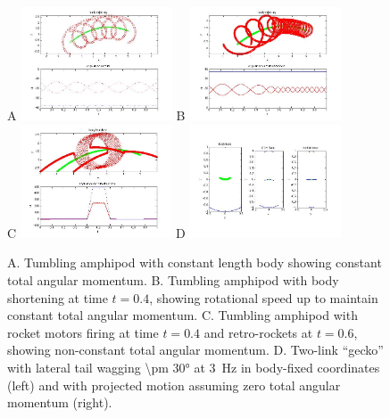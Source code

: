 \documentclass{amsart}
\begin{document}
\begin{figure}
A \includegraphics[width=0.4\textwidth]{figures/untitled.jpg}
B \includegraphics[width=0.4\textwidth]{figures/zam-fling.jpg} \\
C \includegraphics[width=0.4\textwidth]{figures/nonzam-fling.jpg}
D \includegraphics[width=0.4\textwidth]{figures/zam-joint-pos.jpg}

\caption{A. Tumbling amphipod with constant length body showing constant total angular momentum. B. Tumbling amphipod with body shortening at time $t=0.4$, showing rotational speed up to maintain constant total angular momentum. C. Tumbling amphipod with rocket motors firing at time $t=0.4$ and retro-rockets at $t=0.6$, showing non-constant total angular momentum. D. Two-link ``gecko'' with lateral tail wagging \ang{\pm 30} at \SI{3}{\hertz} in body-fixed coordinates (left) and with projected motion assuming zero total angular momentum (right).}
\label{fig:toysim}
\end{figure}
\end{document}
